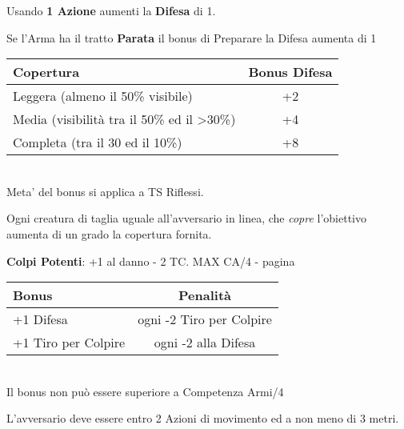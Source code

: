 \documentclass[landscape,10pt,a4paper]{article}
\begin{document}
\begin{multicols}{3}
\begin{dmbox}[title=Preparare la Difesa - pagina \pageref{preparareladifesa}]

Usando \textbf{1 Azione} aumenti la \textbf{Difesa} di 1.

Se l'Arma ha il tratto \textbf{Parata} il bonus di Preparare la Difesa aumenta di 1
\end{dmbox}

\begin{dmbox}[title=Copertura - pagina \pageref{copertura}]
\noindent\begin{tabular}{l|c}
\textbf{Copertura} & \textbf{Bonus Difesa}\\
\hline
Leggera (almeno il 50\% visibile) & +2\\
Media (visibilità tra il 50\% ed il >30\%) & +4 \\
Completa (tra il 30 ed il 10\%) & +8 \\
\end{tabular}\\

Meta' del bonus si applica a TS Riflessi.

Ogni creatura di taglia uguale all'avversario in linea, che \emph{copre} l'obiettivo aumenta di un grado la copertura fornita.

\end{dmbox}

\begin{mybluebox}\textbf{Colpi Potenti}: +1 al danno - 2 TC. MAX CA/4 - pagina \pageref{colpipotenti}\end{mybluebox}


\begin{dmbox}[title=Maestria del combattimento - pagina \pageref{maestriacombattimento}]
\noindent\begin{tabular}{l|c}
\textbf{Bonus} & \textbf{Penalità}\\
\hline
+1 Difesa & ogni -2 Tiro per Colpire\\
+1 Tiro per Colpire & ogni -2 alla Difesa
\end{tabular}\\

Il bonus non può essere superiore a Competenza Armi/4
\end{dmbox}

\begin{dmbox}[title=Carica - pagina \pageref{carica}]

L'avversario deve essere entro 2 Azioni di movimento ed a non meno di 3 metri.


\end{dmbox}
\end{multicols}
\end{document}
